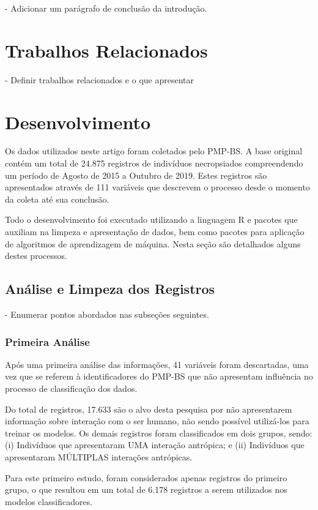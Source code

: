 \documentclass[12pt]{article}
\begin{document}
- Adicionar um parágrafo de conclusão da introdução.

\section{Trabalhos Relacionados}

- Definir trabalhos relacionados e o que apresentar

\section{Desenvolvimento}

Os dados utilizados neste artigo foram coletados pelo PMP-BS. A base original contém um total de 24.875 registros de indivíduos necropsiados compreendendo um período de Agosto de 2015 a Outubro de 2019. Estes registros são apresentados através de 111 variáveis que descrevem o processo desde o momento da coleta até sua conclusão.

Todo o desenvolvimento foi executado utilizando a linguagem R e pacotes que auxiliam na limpeza e apresentação de dados, bem como pacotes para aplicação de algoritmos de aprendizagem de máquina. Nesta seção são detalhados alguns destes processos.

\subsection{Análise e Limpeza dos Registros}

- Enumerar pontos abordados nas subseções seguintes.

\subsubsection{Primeira Análise}

Após uma primeira análise das informações, 41 variáveis foram descartadas, uma vez que se referem à identificadores do PMP-BS que não apresentam influência no processo de classificação dos dados.

Do total de registros, 17.633 são o alvo desta pesquisa por não apresentarem informação sobre interação com o ser humano, não sendo possível utilizá-los para treinar os modelos. Os demais registros foram classificados em dois grupos, sendo: (i) Indivíduos que apresentaram UMA interação antrópica; e (ii) Indivíduos que apresentaram MÚLTIPLAS interações antrópicas.

Para este primeiro estudo, foram considerados apenas registros do primeiro grupo, o que resultou em um total de 6.178 registros a serem utilizados nos modelos classificadores.
\end{document}
